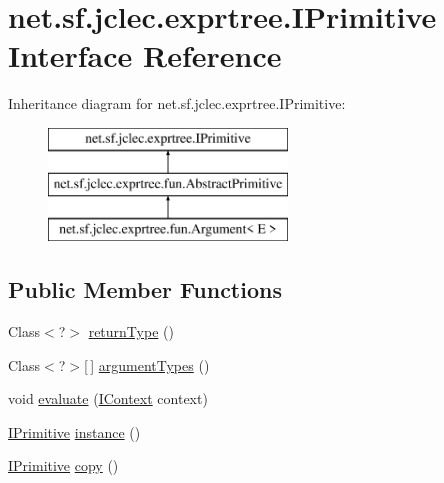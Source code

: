 \hypertarget{interfacenet_1_1sf_1_1jclec_1_1exprtree_1_1_i_primitive}{\section{net.\-sf.\-jclec.\-exprtree.\-I\-Primitive Interface Reference}
\label{interfacenet_1_1sf_1_1jclec_1_1exprtree_1_1_i_primitive}
}
Inheritance diagram for net.\-sf.\-jclec.\-exprtree.\-I\-Primitive\-:\begin{figure}[H]
\begin{center}
\leavevmode
\includegraphics[height=3.000000cm]{interfacenet_1_1sf_1_1jclec_1_1exprtree_1_1_i_primitive}
\end{center}
\end{figure}
\subsection*{Public Member Functions}
\begin{DoxyCompactItemize}
\item 
Class$<$?$>$ \hyperlink{interfacenet_1_1sf_1_1jclec_1_1exprtree_1_1_i_primitive_abb11493892f62e22a28a3cb308f6ade0}{return\-Type} ()
\item 
Class$<$?$>$\mbox{[}$\,$\mbox{]} \hyperlink{interfacenet_1_1sf_1_1jclec_1_1exprtree_1_1_i_primitive_a6bff2fc5a8da22cf293eb8c598feafdb}{argument\-Types} ()
\item 
void \hyperlink{interfacenet_1_1sf_1_1jclec_1_1exprtree_1_1_i_primitive_aa47420c86591bf3d59b16fd5de47a2fc}{evaluate} (\hyperlink{interfacenet_1_1sf_1_1jclec_1_1exprtree_1_1_i_context}{I\-Context} context)
\item 
\hyperlink{interfacenet_1_1sf_1_1jclec_1_1exprtree_1_1_i_primitive}{I\-Primitive} \hyperlink{interfacenet_1_1sf_1_1jclec_1_1exprtree_1_1_i_primitive_af9c00725e29b88a7361b99cc0314828f}{instance} ()
\item 
\hyperlink{interfacenet_1_1sf_1_1jclec_1_1exprtree_1_1_i_primitive}{I\-Primitive} \hyperlink{interfacenet_1_1sf_1_1jclec_1_1exprtree_1_1_i_primitive_ab7d011b4e39a8c7f3152e199ed18aba9}{copy} ()
\end{DoxyCompactItemize}


